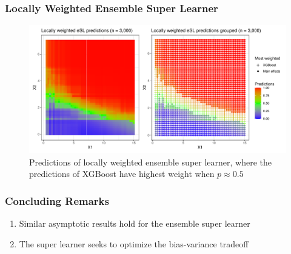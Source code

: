 \documentclass{beamer}
\begin{document}
\begin{frame}
    \frametitle{Locally Weighted Ensemble Super Learner} 
    \begin{figure}[H]
        \centering
        \centerline{\includegraphics[width=1.1\textwidth]{figures/esl_preds_lw_stratified_tiled5.pdf}}
        \caption{Predictions of locally weighted ensemble super learner, where the predictions of XGBoost have highest weight when $ p \approx 0.5 $}
        \label{fig:esl_preds_lw_stratified_tiled5}
    \end{figure}
\end{frame}

\begin{frame}
    \frametitle{Concluding Remarks} 
    \begin{enumerate}
        \item Similar asymptotic results hold for the ensemble super learner
        \item The super learner seeks to optimize the bias-variance tradeoff 
    \end{enumerate}
\end{frame}
 
\end{document}
